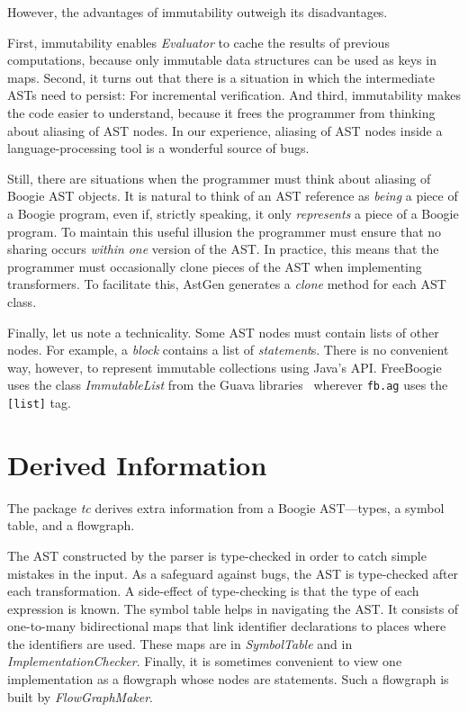 \documentclass{llncs}
\begin{document}
However, the advantages of immutability outweigh its
disadvantages.

First, immutability enables \textit{Evaluator} to cache the results of
previous computations, because only immutable data structures can be used
as keys in maps. Second, it turns out that there is a situation in which
the intermediate ASTs need to persist: For incremental verification.  And
third, immutability makes the code easier to understand, because it frees
the programmer from thinking about aliasing of AST nodes. In our
experience, aliasing of AST nodes inside a language-processing tool is a
wonderful source of bugs.

Still, there are situations when the programmer must think about aliasing
of Boogie AST objects. It is natural to think of an AST reference as
\emph{being} a piece of a Boogie program, even if, strictly speaking, it
only \emph{represents} a piece of a Boogie program. To maintain this useful
illusion the programmer must ensure that no sharing occurs \emph{within}
\emph{one} version of the AST\null. In practice, this means that the
programmer must occasionally clone pieces of the AST when implementing
transformers. To facilitate this, AstGen generates a \textit{clone} method
for each AST class.

Finally, let us note a technicality. Some AST nodes must contain lists of
other nodes. For example, a \textit{block} contains a list of
\textit{statement}s. There is no convenient way, however, to represent
immutable collections using Java's API. FreeBoogie uses the class
\textit{ImmutableList} from the Guava libraries~\cite{guava-libraries}
wherever \texttt{fb.ag} uses the \texttt{[list]} tag.

\section{Derived Information} %

The package \textit{tc} derives extra information from a Boogie
AST---types, a symbol table, and a flowgraph.

The AST constructed by the parser is type-checked in order to catch simple
mistakes in the input. As a safeguard against bugs, the AST is type-checked
after each transformation. A side-effect of type-checking is that the type
of each expression is known.  The symbol table helps in navigating the
AST\null. It consists of one-to-many bidirectional maps that link
identifier declarations to places where the identifiers are used. These
maps are in \textit{SymbolTable} and in \textit{ImplementationChecker}.
Finally, it is sometimes convenient to view one implementation as a
flowgraph whose nodes are statements. Such a flowgraph is built by
\textit{FlowGraphMaker}.
\end{document}
